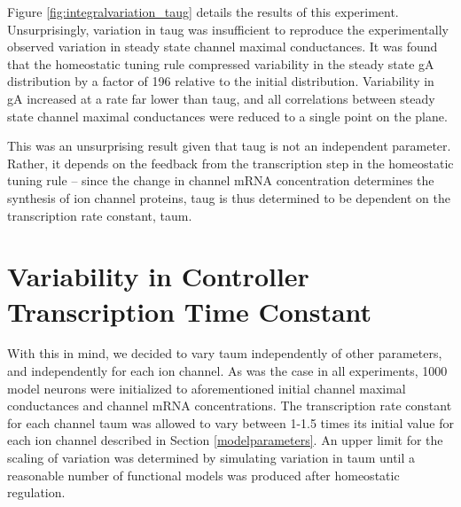 Figure \ref{fig:integralvariation_taug} details the results of this experiment. Unsurprisingly, variation in \ac{taug} was insufficient to reproduce the experimentally observed variation in steady state channel maximal conductances. It was found that the homeostatic tuning rule compressed variability in the steady state \ac{gA} distribution by a factor of 196 relative to the initial distribution. Variability in \ac{gA} increased at a rate far lower than \ac{taug}, and all correlations between steady state channel maximal conductances were reduced to a single point on the plane.

This was an unsurprising result given that \ac{taug} is not an independent parameter. Rather, it depends on the feedback from the transcription step in the homeostatic tuning rule -- since the change in channel mRNA concentration determines the synthesis of ion channel proteins, \ac{taug} is thus determined to be dependent on the transcription rate constant, \ac{taum}.

\section{Variability in Controller Transcription Time Constant}

With this in mind, we decided to vary \ac{taum} independently of other parameters, and independently for each ion channel. As was the case in all experiments, 1000 model neurons were initialized to aforementioned initial channel maximal conductances and channel mRNA concentrations. The transcription rate constant for each channel \ac{taum} was allowed to vary between 1-1.5 times its initial value for each ion channel described in Section \ref{modelparameters}. An upper limit for the scaling of variation was determined by simulating variation in \ac{taum} until a reasonable number of functional models was produced after homeostatic regulation.

